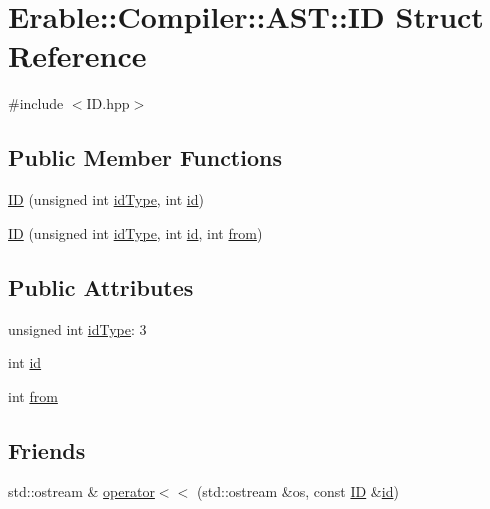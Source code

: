 \hypertarget{struct_erable_1_1_compiler_1_1_a_s_t_1_1_i_d}{}\section{Erable\+::Compiler\+::A\+ST\+::ID Struct Reference}
\label{struct_erable_1_1_compiler_1_1_a_s_t_1_1_i_d}


{\ttfamily \#include $<$I\+D.\+hpp$>$}

\subsection*{Public Member Functions}
\begin{DoxyCompactItemize}
\item 
\mbox{\hyperlink{struct_erable_1_1_compiler_1_1_a_s_t_1_1_i_d_a35bbbf2cebf1aa869f3f2bc0112ab86e}{ID}} (unsigned int \mbox{\hyperlink{struct_erable_1_1_compiler_1_1_a_s_t_1_1_i_d_a747fe3b9ebea1c222c7e93e734ff7d33}{id\+Type}}, int \mbox{\hyperlink{struct_erable_1_1_compiler_1_1_a_s_t_1_1_i_d_a78f638fbb291e7243ab45e6846620043}{id}})
\item 
\mbox{\hyperlink{struct_erable_1_1_compiler_1_1_a_s_t_1_1_i_d_a6bd14a7a8078d0bc804e4ec157839378}{ID}} (unsigned int \mbox{\hyperlink{struct_erable_1_1_compiler_1_1_a_s_t_1_1_i_d_a747fe3b9ebea1c222c7e93e734ff7d33}{id\+Type}}, int \mbox{\hyperlink{struct_erable_1_1_compiler_1_1_a_s_t_1_1_i_d_a78f638fbb291e7243ab45e6846620043}{id}}, int \mbox{\hyperlink{struct_erable_1_1_compiler_1_1_a_s_t_1_1_i_d_a671b6243056d15bdbf67813af4ec1170}{from}})
\end{DoxyCompactItemize}
\subsection*{Public Attributes}
\begin{DoxyCompactItemize}
\item 
unsigned int \mbox{\hyperlink{struct_erable_1_1_compiler_1_1_a_s_t_1_1_i_d_a747fe3b9ebea1c222c7e93e734ff7d33}{id\+Type}}\+: 3
\item 
int \mbox{\hyperlink{struct_erable_1_1_compiler_1_1_a_s_t_1_1_i_d_a78f638fbb291e7243ab45e6846620043}{id}}
\item 
int \mbox{\hyperlink{struct_erable_1_1_compiler_1_1_a_s_t_1_1_i_d_a671b6243056d15bdbf67813af4ec1170}{from}}
\end{DoxyCompactItemize}
\subsection*{Friends}
\begin{DoxyCompactItemize}
\item 
std\+::ostream \& \mbox{\hyperlink{struct_erable_1_1_compiler_1_1_a_s_t_1_1_i_d_ac040cb5e925631aa5db9e54c96385974}{operator$<$$<$}} (std\+::ostream \&os, const \mbox{\hyperlink{struct_erable_1_1_compiler_1_1_a_s_t_1_1_i_d}{ID}} \&\mbox{\hyperlink{struct_erable_1_1_compiler_1_1_a_s_t_1_1_i_d_a78f638fbb291e7243ab45e6846620043}{id}})
\end{DoxyCompactItemize}


